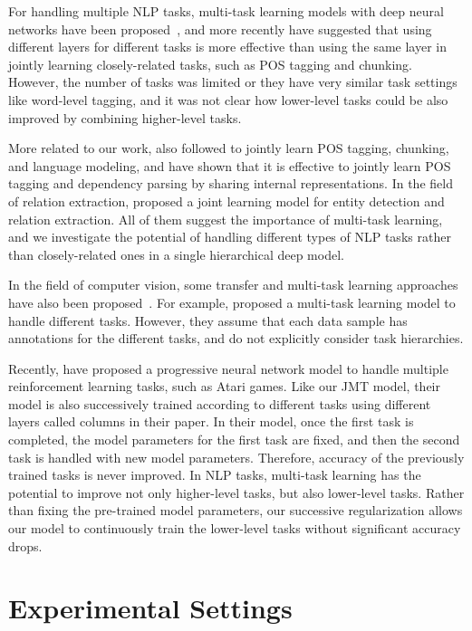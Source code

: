 \documentclass[11pt,a4paper]{article}
\begin{document}
For handling multiple NLP tasks, multi-task learning models with deep neural networks have been proposed~\citep{collobert2011senna,luong2016mtl}, and more recently \citet{sogaard2016} have suggested that using different layers for different tasks is more effective than using the same layer in jointly learning closely-related tasks, such as POS tagging and chunking.
However, the number of tasks was limited or they have very similar task settings like word-level tagging, and it was not clear how lower-level tasks could be also improved by combining higher-level tasks.

More related to our work, \citet{godwin2016multi} also followed \citet{sogaard2016} to jointly learn POS tagging, chunking, and language modeling, and \citet{zhang2016stackprop} have shown that it is effective to jointly learn POS tagging and dependency parsing by sharing internal representations.
In the field of relation extraction, \citet{miwa2016rel} proposed a joint learning model for entity detection and relation extraction.
All of them suggest the importance of multi-task learning, and we investigate the potential of handling different types of NLP tasks rather than closely-related ones in a single hierarchical deep model.

In the field of computer vision, some transfer and multi-task learning approaches have also been proposed~\citep{li2016multi,misra2016multi}.
For example, \citet{misra2016multi} proposed a multi-task learning model to handle different tasks.
However, they assume that each data sample has annotations for the different tasks, and do not explicitly consider task hierarchies.

Recently, \citet{rusu2016progressive} have proposed a progressive neural network model to handle multiple reinforcement learning tasks, such as Atari games.
Like our JMT model, their model is also successively trained according to different tasks using different layers called columns in their paper.
In their model, once the first task is completed, the model parameters for the first task are fixed, and then the second task is handled with new model parameters.
Therefore, accuracy of the previously trained tasks is never improved.
In NLP tasks, multi-task learning has the potential to improve not only higher-level tasks, but also lower-level tasks.
Rather than fixing the pre-trained model parameters, our successive regularization allows our model to continuously train the lower-level tasks without significant accuracy drops.

\section{Experimental Settings}
\end{document}
